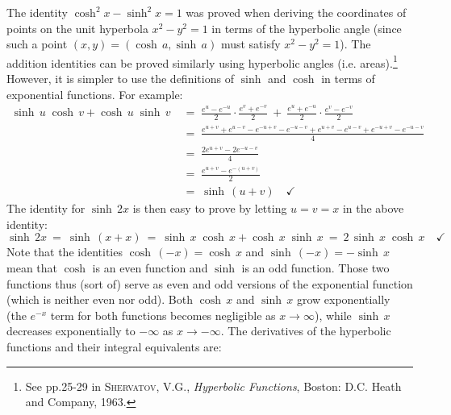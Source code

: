 The identity $\cosh^2 x - \sinh^2 x = 1$ was proved when deriving the
coordinates of points on the unit hyperbola $x^2-y^2=1$ in terms of the
hyperbolic angle (since such a point $(x,y) = (\cosh\,a,\sinh\,a)$ must satisfy
$x^2-y^2=1$). The addition identities can be proved similarly using hyperbolic
angles (i.e. areas).\footnote{See pp.25-29 in \textsc{Shervatov, V.G.},
\emph{Hyperbolic Functions}, Boston: D.C. Heath and Company, 1963.} However, it
is simpler to use the definitions of $\sinh$ and $\cosh$ in terms of exponential
functions. For example:
\begin{align*}
\sinh\,u\;\cosh\,v + \cosh\,u\;\sinh\,v \;&=\; \frac{e^u - e^{-u}}{2} \cdot \frac{e^v + e^{-v}}{2}
 ~+~ \frac{e^u + e^{-u}}{2} \cdot \frac{e^v - e^{-v}}{2}\\[4pt]
&=\; \frac{e^{u+v}+e^{u-v}-e^{-u+v}-e^{-u-v}+e^{u+v}-e^{u-v}+e^{-u+v}-e^{-u-v}}{4}\\
&=\; \frac{2e^{u+v} - 2e^{-u-v}}{4}\\[4pt]
&=\; \frac{e^{u+v} - e^{-(u+v)}}{2}\\[2pt]
&=\; \sinh\,(u+v) \quad\checkmark
\end{align*}
The identity for $\sinh\,2x$ is then easy to prove by letting $u=v=x$ in the
above identity:
\[
\sinh\,2x ~=~ \sinh\,(x+x) ~=~ \sinh\,x\;\cosh\,x + \cosh\,x\;\sinh\,x ~=~
2\,\sinh\,x\;\cosh\,x \quad\checkmark
\]
Note that the identities $\cosh\,(-x) = \cosh\,x$ and $\sinh\,(-x) = -\sinh\,x$
mean that $\cosh$ is an even function and $\sinh$ is an odd function. Those two
functions thus (sort of) serve as even and odd versions of the exponential
function (which is neither even nor odd). Both $\cosh\,x$ and $\sinh\,x$
grow exponentially (the $e^{-x}$ term for both functions becomes negligible as
$x \to \infty$), while $\sinh\,x$ decreases exponentially to $-\infty$ as
$x \to -\infty$.
\newpage
\noindent The derivatives of the hyperbolic functions and their integral
equivalents are:

